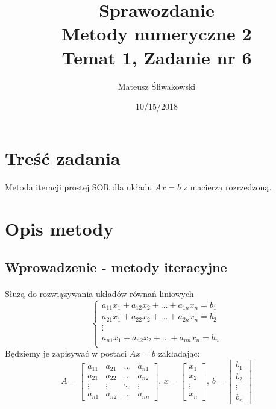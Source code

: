\documentclass{article}
\title{Sprawozdanie \\Metody numeryczne 2 \\\textbf{Temat 1, Zadanie nr 6}}
\date{10/15/2018}
\author{Mateusz Śliwakowski}
\begin{document}
  \maketitle
  \newpage

\section{Treść zadania}
\paragraph{}
 Metoda iteracji prostej SOR dla układu \(Ax = b\) z macierzą rozrzedzoną.
\section{Opis metody}

\subsection {Wprowadzenie - metody iteracyjne}
\paragraph{}
Służą do rozwiązywania układów równań liniowych
\[
\left\{ 
\begin{array}{c}
a_{11}x_1+a_{12}x_2+\dots+a_{1n}x_n=b_1 \\ 
a_{21}x_1+a_{22}x_2+\dots+a_{2n}x_n=b_2 \\ 
\vdots\\
a_{n1}x_1+a_{n2}x_2+\dots+a_{nn}x_n=b_n \\ 
\end{array}
\right. 
\]
Będziemy je zapisywać w postaci \(Ax = b\) zakładając: \\
\[A=\begin{bmatrix}
  a_{11} & a_{21} & \dots & a_{n1}\\
  a_{21} & a_{22} & \dots & a_{n2}\\
 \vdots & \vdots & \ddots & \vdots \\
  a_{n1} & a_{n2} & \dots & a_{nn}
\end{bmatrix},\hspace{2pt}
 x=\begin{bmatrix}
 x_1\\
 x_2\\
 \vdots\\
 x_n
\end{bmatrix}, \hspace{2pt}
 b=\begin{bmatrix}
 b_1\\
 b_2\\
 \vdots\\
 b_n
\end{bmatrix}\]
\end{document}
